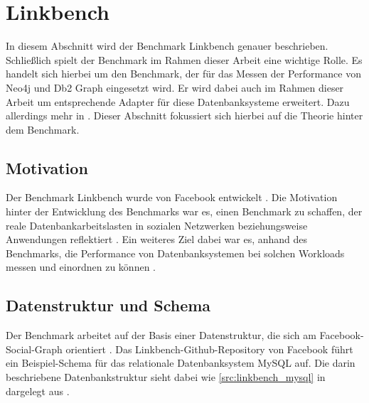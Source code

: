 \section{Linkbench}
\label{linkbench}
In diesem Abschnitt wird der Benchmark Linkbench genauer beschrieben. Schließlich spielt der Benchmark im Rahmen dieser Arbeit eine wichtige Rolle. Es handelt sich hierbei um den Benchmark, der für das Messen der Performance von Neo4j und Db2 Graph eingesetzt wird. Er wird dabei auch im Rahmen dieser Arbeit um entsprechende Adapter für diese Datenbanksysteme erweitert. Dazu allerdings mehr in . Dieser Abschnitt fokussiert sich hierbei auf die Theorie hinter dem Benchmark. 

\subsection{Motivation}
Der Benchmark Linkbench wurde von Facebook entwickelt \cite{linkbench_paper}. Die Motivation hinter der Entwicklung des Benchmarks war es, einen Benchmark zu schaffen, der reale Datenbankarbeitslasten in sozialen Netzwerken beziehungsweise Anwendungen reflektiert \cite{linkbench_paper}. Ein weiteres Ziel dabei war es, anhand des Benchmarks, die Performance von Datenbanksystemen bei solchen Workloads messen und einordnen zu können \cite{linkbench_paper}.

\subsection{Datenstruktur und Schema}
Der Benchmark arbeitet auf der Basis einer Datenstruktur, die sich am Facebook-Social-Graph orientiert \cite{linkbench_paper}. Das Linkbench-Github-Repository \cite{fb_linkbench_github} von Facebook führt ein Beispiel-Schema für das relationale Datenbanksystem MySQL auf. Die darin beschriebene Datenbankstruktur sieht dabei wie \autoref{src:linkbench_mysql} in dargelegt aus \cite{fb_linkbench_github}. 

